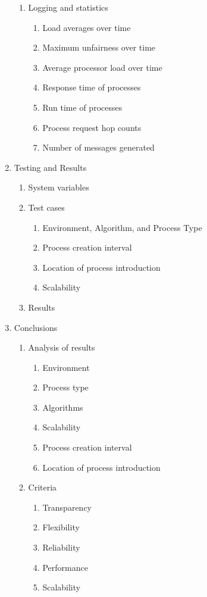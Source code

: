 \documentclass{slides}
\begin{document}
\begin{enumerate}
\begin{enumerate}
		\item Logging and statistics
		\begin{enumerate}
			\item Load averages over time
			\item Maximum unfairness over time
			\item Average processor load over time
			\item Response time of processes
			\item Run time of processes
			\item Process request hop counts
			\item Number of messages generated
		\end{enumerate}
	\end{enumerate}

	\item Testing and Results
	\begin{enumerate}
		\item System variables
		\item Test cases
		\begin{enumerate}
			\item Environment, Algorithm, and Process Type
			\item Process creation interval
			\item Location of process introduction
			\item Scalability
		\end{enumerate}

		\item Results
	\end{enumerate}

	\item Conclusions
	\begin{enumerate}
		\item Analysis of results
		\begin{enumerate}
			\item Environment
			\item Process type
			\item Algorithms
			\item Scalability
			\item Process creation interval
			\item Location of process introduction
		\end{enumerate}

		\item Criteria
		\begin{enumerate}
			\item Transparency
			\item Flexibility
			\item Reliability
			\item Performance
			\item Scalability
		\end{enumerate}

	\end{enumerate}
\end{enumerate}
\end{document}
